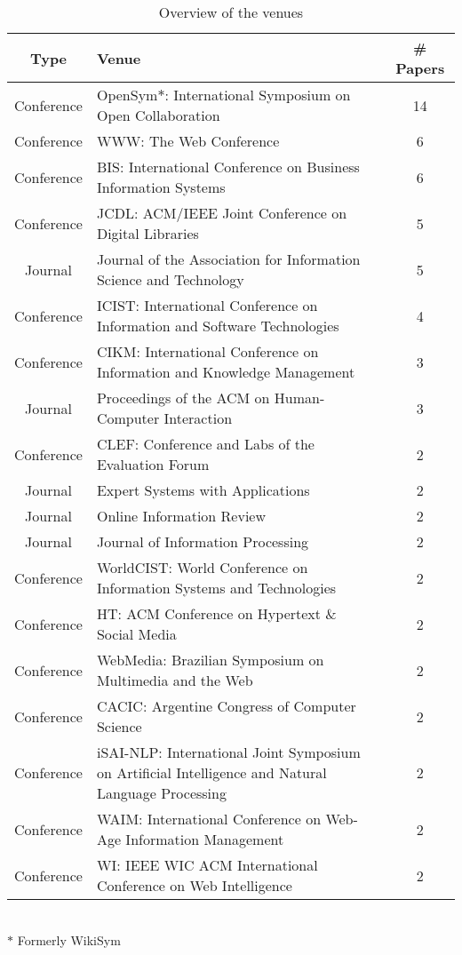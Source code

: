 \begin{table}[htbp]
    \caption{Overview of the venues}
    \label{tab:venues}
    \centering
    \begin{tabular}{c m{} c}
        \toprule
        \textbf{Type} & \textbf{Venue} & \textbf{\# Papers} \\
        \midrule
        Conference & OpenSym$*$: International Symposium on Open Collaboration & 14 \\
        Conference & WWW: The Web Conference & 6 \\
        Conference & BIS: International Conference on Business Information Systems & 6 \\
        Conference & JCDL: ACM/IEEE Joint Conference on Digital Libraries & 5 \\
        Journal & Journal of the Association for Information Science and Technology & 5 \\
        Conference & ICIST: International Conference on Information and Software Technologies & 4 \\
        Conference & CIKM: International Conference on Information and Knowledge Management & 3 \\
        Journal & Proceedings of the ACM on Human-Computer Interaction & 3 \\
        Conference & CLEF: Conference and Labs of the Evaluation Forum & 2 \\
        Journal & Expert Systems with Applications & 2 \\
        Journal & Online Information Review & 2 \\
        Journal & Journal of Information Processing & 2 \\
        Conference & WorldCIST: World Conference on Information Systems and Technologies & 2 \\
        Conference & HT: ACM Conference on Hypertext \& Social Media & 2 \\
        Conference & WebMedia: Brazilian Symposium on Multimedia and the Web & 2 \\
        Conference & CACIC: Argentine Congress of Computer Science & 2 \\
        Conference & iSAI-NLP: International Joint Symposium on Artificial Intelligence and Natural Language Processing & 2 \\
        Conference & WAIM: International Conference on Web-Age Information Management & 2 \\
        Conference & WI: IEEE WIC ACM International Conference on Web Intelligence & 2 \\
        \bottomrule
    \end{tabular}
    \\ \vspace{0.1cm}
    \footnotesize
    $*$ Formerly WikiSym
\end{table}
